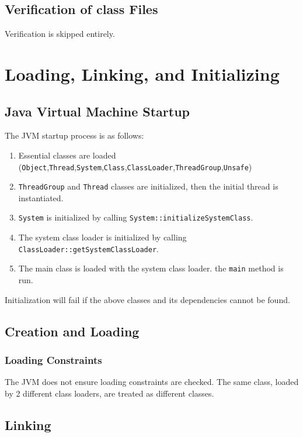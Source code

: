 \subsection{Verification of class Files}

Verification is skipped entirely.

\section{Loading, Linking, and Initializing}

\subsection{Java Virtual Machine Startup}

The JVM startup process is as follows:

\begin{enumerate}
	\item Essential classes are loaded (\texttt{Object},\texttt{Thread},\texttt{System},\texttt{Class},\texttt{ClassLoader},\texttt{ThreadGroup},\texttt{Unsafe})
	\item \texttt{ThreadGroup} and \texttt{Thread} classes are initialized, then the initial thread is instantiated.
	\item \texttt{System} is initialized by calling \texttt{System::initializeSystemClass}.
	\item The system class loader is initialized by calling \texttt{ClassLoader::getSystemClassLoader}.
	\item The main class is loaded with the system class loader. the \texttt{main} method is run.
\end{enumerate}

Initialization will fail if the above classes and its dependencies cannot be found.

\subsection{Creation and Loading}
\addtocounter{subsubsection}{3}
\subsubsection{Loading Constraints}

The JVM does not ensure loading constraints are checked. The same class, loaded by 2 different class loaders, are treated as different classes.

\subsection{Linking}

